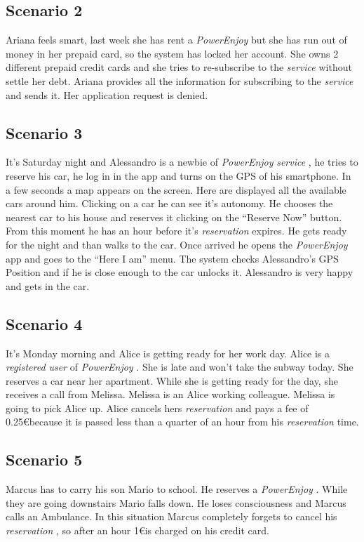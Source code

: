 \documentclass[english]{article}
\newcommand{\powerenjoy}{\textit{PowerEnjoy }}
\newcommand{\registereduser}{\textit {registered user }}
\newcommand{\service}{\textit{service }}
\newcommand{\reservation}{\textit{reservation }}
\begin{document}
	\subsection{Scenario 2}
		Ariana feels smart, last week she has rent a \powerenjoy but she has run out of money in her prepaid card, so the system has locked her account. She owns 2 different prepaid credit cards and she tries to re-subscribe to the \service without settle her debt. Ariana provides all the information for subscribing to the \service and sends it. Her application request is denied.
	\subsection{Scenario 3}
		It's Saturday night and Alessandro is a newbie of \powerenjoy \service, he tries to reserve his car, he log in in the app and turns on the GPS of his smartphone. In a few seconds a map appears on the screen. Here are displayed all the available cars around him. Clicking on a car he can see it's autonomy. He chooses the nearest car to his house and reserves it clicking on the ``Reserve Now'' button. From this moment he has an hour before it's \reservation expires. He gets ready for the night and than walks to the car. Once arrived he opens the 	\powerenjoy app and goes to the ``Here I am'' menu. The system checks Alessandro's GPS Position and if he is close enough to the car unlocks it. Alessandro is very happy and gets in the car.
	\subsection{Scenario 4}
		It's Monday morning and Alice is getting ready for her work day. Alice is a \registereduser of \powerenjoy . She is late and won't take the subway today. She reserves a car near her apartment. While she is getting ready for the day, she receives a call from Melissa. Melissa is an Alice working colleague. Melissa is going to pick Alice up. Alice cancels hers \reservation and pays a fee of 0.25\euro because it is passed less than a quarter of an hour from his \reservation time.
	\subsection{Scenario 5}
		Marcus has to carry his son Mario to school. He reserves a \powerenjoy. While they are going downstairs Mario falls down. He loses consciousness and Marcus calls an Ambulance. In this situation Marcus completely forgets to cancel his \reservation, so after an hour 1\euro is charged	on his credit card.
\end{document}
